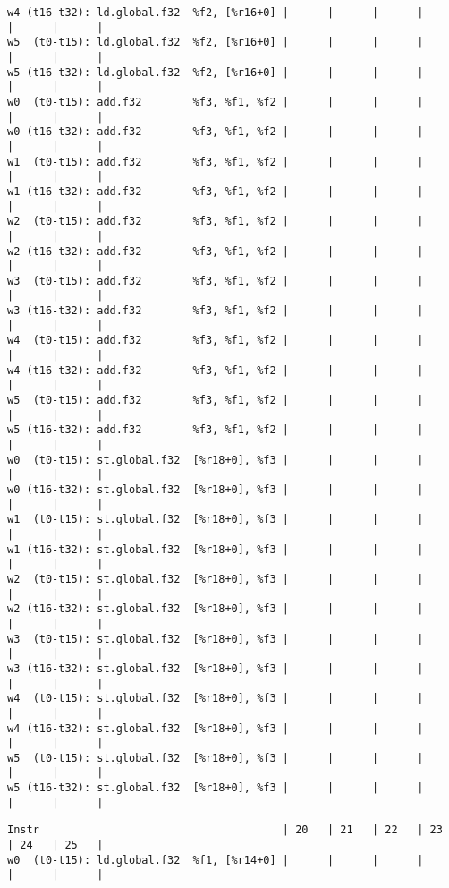 \documentclass[11pt]{article}
\begin{document}
\begin{Answer}
\begin{verbatim}
w4 (t16-t32): ld.global.f32  %f2, [%r16+0] |      |      |      |      |      |      |
w5  (t0-t15): ld.global.f32  %f2, [%r16+0] |      |      |      |      |      |      |
w5 (t16-t32): ld.global.f32  %f2, [%r16+0] |      |      |      |      |      |      |
w0  (t0-t15): add.f32        %f3, %f1, %f2 |      |      |      |      |      |      |
w0 (t16-t32): add.f32        %f3, %f1, %f2 |      |      |      |      |      |      |
w1  (t0-t15): add.f32        %f3, %f1, %f2 |      |      |      |      |      |      |
w1 (t16-t32): add.f32        %f3, %f1, %f2 |      |      |      |      |      |      |
w2  (t0-t15): add.f32        %f3, %f1, %f2 |      |      |      |      |      |      |
w2 (t16-t32): add.f32        %f3, %f1, %f2 |      |      |      |      |      |      |
w3  (t0-t15): add.f32        %f3, %f1, %f2 |      |      |      |      |      |      |
w3 (t16-t32): add.f32        %f3, %f1, %f2 |      |      |      |      |      |      |
w4  (t0-t15): add.f32        %f3, %f1, %f2 |      |      |      |      |      |      |
w4 (t16-t32): add.f32        %f3, %f1, %f2 |      |      |      |      |      |      |
w5  (t0-t15): add.f32        %f3, %f1, %f2 |      |      |      |      |      |      |
w5 (t16-t32): add.f32        %f3, %f1, %f2 |      |      |      |      |      |      |
w0  (t0-t15): st.global.f32  [%r18+0], %f3 |      |      |      |      |      |      |
w0 (t16-t32): st.global.f32  [%r18+0], %f3 |      |      |      |      |      |      |
w1  (t0-t15): st.global.f32  [%r18+0], %f3 |      |      |      |      |      |      |
w1 (t16-t32): st.global.f32  [%r18+0], %f3 |      |      |      |      |      |      |
w2  (t0-t15): st.global.f32  [%r18+0], %f3 |      |      |      |      |      |      |
w2 (t16-t32): st.global.f32  [%r18+0], %f3 |      |      |      |      |      |      |
w3  (t0-t15): st.global.f32  [%r18+0], %f3 |      |      |      |      |      |      |
w3 (t16-t32): st.global.f32  [%r18+0], %f3 |      |      |      |      |      |      |
w4  (t0-t15): st.global.f32  [%r18+0], %f3 |      |      |      |      |      |      |
w4 (t16-t32): st.global.f32  [%r18+0], %f3 |      |      |      |      |      |      |
w5  (t0-t15): st.global.f32  [%r18+0], %f3 |      |      |      |      |      |      |
w5 (t16-t32): st.global.f32  [%r18+0], %f3 |      |      |      |      |      |      |
\end{verbatim}
	\newpage
	\begin{verbatim}
Instr                                      | 20   | 21   | 22   | 23   | 24   | 25   |
w0  (t0-t15): ld.global.f32  %f1, [%r14+0] |      |      |      |      |      |      |

\end{verbatim}
\end{Answer}
\end{document}
